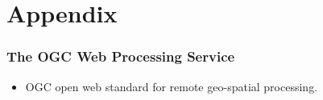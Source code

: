 \documentclass{beamer}
\begin{document}
\appendix

\section{Appendix}

\begin{frame}
\frametitle<presentation>{The OGC Web Processing Service}

  \begin{itemize}
    \item OGC open web standard for remote geo-spatial processing.
  \end{itemize}
\end{frame}
\end{document}
